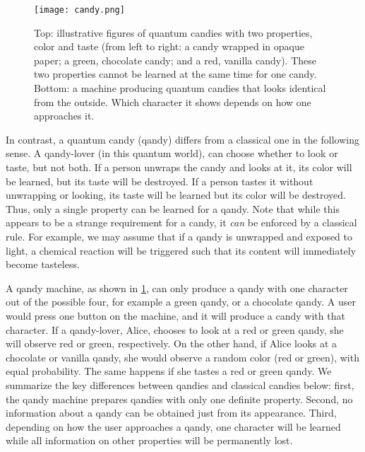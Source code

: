 \documentclass{article}
\begin{document}
\begin{figure}[ht]
	\centering
	\texttt{[image: candy.png]}
	\caption{Top: illustrative figures of quantum candies with two properties, color and taste (from left to right: a  candy wrapped in opaque paper; a green, chocolate candy; and a red, vanilla candy). 
	These two properties cannot be learned at the same time for one candy. 
	Bottom: a machine producing quantum candies that looks identical from the outside. 
	Which character it shows depends on how one approaches it.} 
	\label{candy}
\end{figure}

In contrast, a quantum candy (qandy) differs from a classical one in the following sense.
A qandy-lover (in this quantum world), can choose whether to look or taste, but not both.
If a person unwraps the candy and looks at it, its color will be learned, but its taste will be destroyed.
If a person tastes it without unwrapping or looking, its taste will be learned but its color will be destroyed.
Thus, only a single property can be learned for a qandy.
Note that while this appears to be a strange requirement for a candy, it \textit{can} be enforced by a classical rule.
For example, we may assume that if a qandy is unwrapped and exposed to light, a chemical reaction will be triggered such that its content will immediately become tasteless.

A qandy machine, as shown in \cref{candy}, can only produce a qandy with one character out of the possible four, for example a green qandy, or a chocolate qandy.
A user would press one button on the machine, and it will produce a candy with that character.
If a qandy-lover, Alice, chooses to look at a red or green qandy, she will observe red or green, respectively.
On the other hand, if Alice looks at a chocolate or vanilla qandy, she would observe a random color (red or green), with equal probability.
The same happens if she tastes a red or green qandy.
We summarize the key differences between qandies and classical candies below: first, the qandy machine prepares qandies with only one definite property.
Second, no information about a qandy can be obtained just from its appearance.
Third, depending on how the user approaches a qandy, one character will be learned while all information on other properties will be permanently lost.
\end{document}
